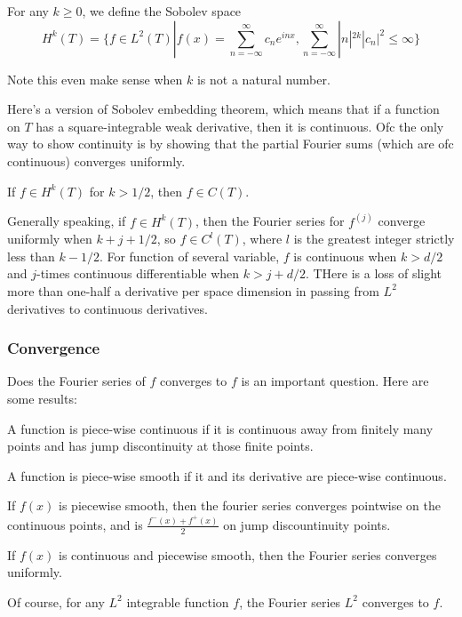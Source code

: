 \documentclass[main.tex]{subfiles}
\begin{document}
For any $k \geq 0$, we define the Sobolev space
$$
H^k(T) = \{f \in L^2(T) | f(x) = \sum_{n = -\infty} ^{\infty} c_n e^{inx}, \sum_{n = -\infty} ^{\infty} |n|^{2k}|c_n|^2 \leq \infty \}
$$

Note this even make sense when $k$ is not a natural number.

Here's a version of Sobolev embedding theorem, which means that if a function on $T$ has a square-integrable weak derivative, then it is continuous. Ofc the only way to show continuity is by showing that the partial Fourier sums (which are ofc continuous) converges uniformly.

\begin{theorem}
If $f \in H^k(T)$ for $k > 1/2$, then $f \in C(T)$.
\end{theorem}

Generally speaking, if $f \in H^k(T)$, then the Fourier series for $f^{(j)}$ converge uniformly when $k + j + 1/2$, so $f \in C^l(T)$, where $l$ is the greatest integer strictly less than $k - 1/2$. For function of several variable, $f$ is continuous when $k > d/2$ and $j$-times continuous differentiable when $k > j + d/2$. THere is a loss of slight more than one-half a derivative per space dimension in passing from $L^2$ derivatives to continuous derivatives.

\subsubsection{Convergence}
Does the Fourier series of $f$ converges to $f$ is an important question. Here are some results:

A function is piece-wise continuous if it is continuous away from finitely many points and has jump discontinuity at those finite points.

A function is piece-wise smooth if it and its derivative are piece-wise continuous.
\begin{theorem}
If $f(x)$ is piecewise smooth, then the fourier series converges pointwise on the continuous points, and is $\frac{f^-(x) + f^+(x)}{2}$ on jump discountinuity points.
\end{theorem}

\begin{theorem}
If $f(x)$ is continuous and piecewise smooth, then the Fourier series converges uniformly.
\end{theorem}

Of course, for any $L^2$ integrable function $f$, the Fourier series $L^2$ converges to $f$.
\end{document}
